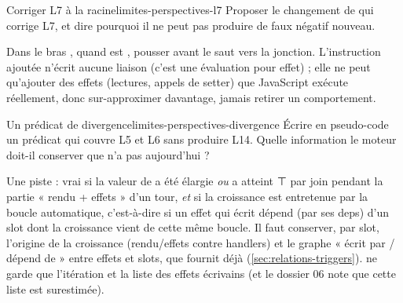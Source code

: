 \begin{exercice}{Corriger L7 à la racine}{limites-perspectives-l7}
Proposer le changement de  qui corrige L7, et dire pourquoi il ne peut pas produire de faux négatif nouveau.
\end{exercice}
\begin{solution}
Dans le bras , quand  est , pousser  avant le saut vers la jonction. L'instruction ajoutée n'écrit aucune liaison (c'est une évaluation pour effet) ; elle ne peut qu'ajouter des effets (lectures, appels de setter) que JavaScript exécute réellement, donc sur-approximer davantage, jamais retirer un comportement.
\end{solution}

\begin{exercice}{Un prédicat de divergence}{limites-perspectives-divergence}
Écrire en pseudo-code un prédicat  qui couvre L5 et L6 sans produire L14. Quelle information le moteur doit-il conserver que  n'a pas aujourd'hui ?
\end{exercice}
\begin{solution}
Une piste :  vrai si la valeur de  a été élargie \emph{ou} a atteint ⊤ par join pendant la partie « rendu + effets » d'un tour, \emph{et} si la croissance est entretenue par la boucle automatique, c'est-à-dire si un effet qui écrit  dépend (par ses deps) d'un slot dont la croissance vient de cette même boucle. Il faut conserver, par slot, l'origine de la croissance (rendu/effets contre handlers) et le graphe « écrit par / dépend de » entre effets et slots, que  fournit déjà (\cref{sec:relations-triggers}).  ne garde que l'itération et la liste des effets écrivains (et le dossier 06 note que cette liste est surestimée).
\end{solution}
